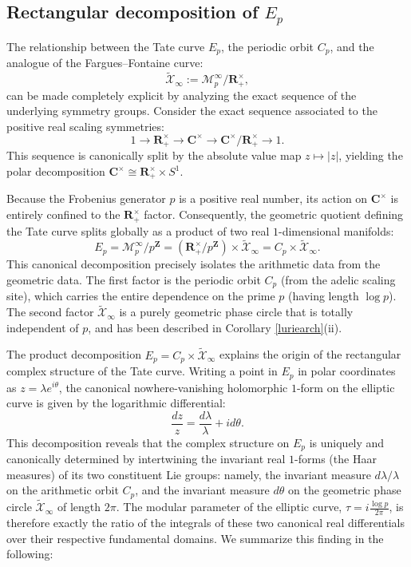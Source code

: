 \documentclass[11pt,a4paper]{article}
\newcommand{\C}{\mathbf{C}}
\newcommand{\R}{\mathbf{R}}
\newcommand{\Z}{\mathbf{Z}}
\begin{document}
\subsection{Rectangular decomposition of $E_p$}

The relationship between the Tate curve $E_p$, the periodic orbit $C_p$, and the analogue of the Fargues--Fontaine curve: 
$$
\widetilde{\mathcal{X}}_\infty:=\mathcal{M}_{p}^{\infty}/\R_+^\times,
$$ 
can be made completely explicit by analyzing the exact sequence of the underlying symmetry groups.
Consider the exact sequence associated to the positive real scaling symmetries:
\[
1 \to \R_+^\times \to \C^\times \to \C^\times/\R_+^\times \to 1.
\]
This sequence is canonically split by the absolute value map $z \mapsto |z|$, yielding the polar decomposition $\C^\times \cong \R_+^\times \times S^1$. 

Because the Frobenius generator $p$ is a positive real number, its action on $\C^\times$ is entirely confined to the $\R_+^\times$ factor. Consequently, the geometric quotient defining the Tate curve splits globally as a product of two real $1$-dimensional manifolds:
\[
E_p = \mathcal{M}_{p}^{\infty} / p^\Z = (\R_+^\times / p^\Z) \times \widetilde{\mathcal{X}}_\infty = C_p \times \widetilde{\mathcal{X}}_\infty.
\]
This canonical decomposition precisely isolates the arithmetic data from the geometric data. The first factor is  the periodic orbit $C_p$ (from the adelic scaling site), which carries the entire dependence on the prime $p$ (having length $\log p$). The second factor $\widetilde{\mathcal{X}}_\infty$ is a purely geometric phase circle that is totally independent of $p$, and has been described in Corollary \ref{luriearch}(ii).





The product decomposition $E_p=C_p \times \widetilde{\mathcal{X}}_\infty$ explains the origin of the rectangular complex structure of the Tate curve. Writing a point in $E_p$ in polar coordinates as $z = \lambda e^{i\theta}$, the canonical nowhere-vanishing holomorphic $1$-form on the elliptic curve is given by the logarithmic differential:
\[
\frac{dz}{z} = \frac{d\lambda}{\lambda} + i d\theta.
\]
This decomposition reveals that the complex structure on $E_p$ is uniquely and canonically determined by intertwining the invariant real $1$-forms (the Haar measures) of its two constituent Lie groups: namely, the invariant measure $d\lambda/\lambda$ on the arithmetic orbit $C_p$, and the invariant measure $d\theta$ on the geometric phase circle $\widetilde{\mathcal{X}}_\infty$ of length $2\pi$. The modular parameter of the elliptic curve, $\tau = i \frac{\log p}{2\pi}$, is therefore exactly the ratio of the integrals of these two canonical real differentials over their respective fundamental domains. We summarize this finding in the following:
\end{document}
